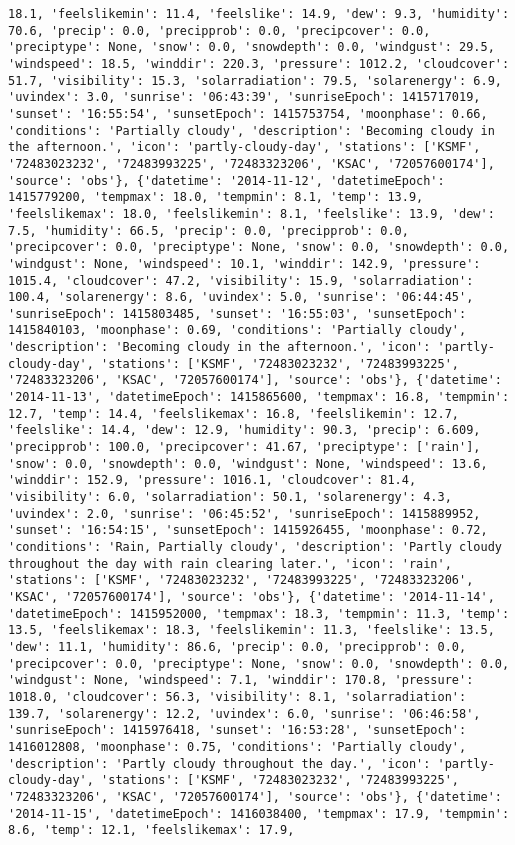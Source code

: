\documentclass[
  letterpaper,
  DIV=11,
  numbers=noendperiod]{scrartcl}
\begin{document}
\begin{verbatim}
18.1, 'feelslikemin': 11.4, 'feelslike': 14.9, 'dew': 9.3, 'humidity': 70.6, 'precip': 0.0, 'precipprob': 0.0, 'precipcover': 0.0, 'preciptype': None, 'snow': 0.0, 'snowdepth': 0.0, 'windgust': 29.5, 'windspeed': 18.5, 'winddir': 220.3, 'pressure': 1012.2, 'cloudcover': 51.7, 'visibility': 15.3, 'solarradiation': 79.5, 'solarenergy': 6.9, 'uvindex': 3.0, 'sunrise': '06:43:39', 'sunriseEpoch': 1415717019, 'sunset': '16:55:54', 'sunsetEpoch': 1415753754, 'moonphase': 0.66, 'conditions': 'Partially cloudy', 'description': 'Becoming cloudy in the afternoon.', 'icon': 'partly-cloudy-day', 'stations': ['KSMF', '72483023232', '72483993225', '72483323206', 'KSAC', '72057600174'], 'source': 'obs'}, {'datetime': '2014-11-12', 'datetimeEpoch': 1415779200, 'tempmax': 18.0, 'tempmin': 8.1, 'temp': 13.9, 'feelslikemax': 18.0, 'feelslikemin': 8.1, 'feelslike': 13.9, 'dew': 7.5, 'humidity': 66.5, 'precip': 0.0, 'precipprob': 0.0, 'precipcover': 0.0, 'preciptype': None, 'snow': 0.0, 'snowdepth': 0.0, 'windgust': None, 'windspeed': 10.1, 'winddir': 142.9, 'pressure': 1015.4, 'cloudcover': 47.2, 'visibility': 15.9, 'solarradiation': 100.4, 'solarenergy': 8.6, 'uvindex': 5.0, 'sunrise': '06:44:45', 'sunriseEpoch': 1415803485, 'sunset': '16:55:03', 'sunsetEpoch': 1415840103, 'moonphase': 0.69, 'conditions': 'Partially cloudy', 'description': 'Becoming cloudy in the afternoon.', 'icon': 'partly-cloudy-day', 'stations': ['KSMF', '72483023232', '72483993225', '72483323206', 'KSAC', '72057600174'], 'source': 'obs'}, {'datetime': '2014-11-13', 'datetimeEpoch': 1415865600, 'tempmax': 16.8, 'tempmin': 12.7, 'temp': 14.4, 'feelslikemax': 16.8, 'feelslikemin': 12.7, 'feelslike': 14.4, 'dew': 12.9, 'humidity': 90.3, 'precip': 6.609, 'precipprob': 100.0, 'precipcover': 41.67, 'preciptype': ['rain'], 'snow': 0.0, 'snowdepth': 0.0, 'windgust': None, 'windspeed': 13.6, 'winddir': 152.9, 'pressure': 1016.1, 'cloudcover': 81.4, 'visibility': 6.0, 'solarradiation': 50.1, 'solarenergy': 4.3, 'uvindex': 2.0, 'sunrise': '06:45:52', 'sunriseEpoch': 1415889952, 'sunset': '16:54:15', 'sunsetEpoch': 1415926455, 'moonphase': 0.72, 'conditions': 'Rain, Partially cloudy', 'description': 'Partly cloudy throughout the day with rain clearing later.', 'icon': 'rain', 'stations': ['KSMF', '72483023232', '72483993225', '72483323206', 'KSAC', '72057600174'], 'source': 'obs'}, {'datetime': '2014-11-14', 'datetimeEpoch': 1415952000, 'tempmax': 18.3, 'tempmin': 11.3, 'temp': 13.5, 'feelslikemax': 18.3, 'feelslikemin': 11.3, 'feelslike': 13.5, 'dew': 11.1, 'humidity': 86.6, 'precip': 0.0, 'precipprob': 0.0, 'precipcover': 0.0, 'preciptype': None, 'snow': 0.0, 'snowdepth': 0.0, 'windgust': None, 'windspeed': 7.1, 'winddir': 170.8, 'pressure': 1018.0, 'cloudcover': 56.3, 'visibility': 8.1, 'solarradiation': 139.7, 'solarenergy': 12.2, 'uvindex': 6.0, 'sunrise': '06:46:58', 'sunriseEpoch': 1415976418, 'sunset': '16:53:28', 'sunsetEpoch': 1416012808, 'moonphase': 0.75, 'conditions': 'Partially cloudy', 'description': 'Partly cloudy throughout the day.', 'icon': 'partly-cloudy-day', 'stations': ['KSMF', '72483023232', '72483993225', '72483323206', 'KSAC', '72057600174'], 'source': 'obs'}, {'datetime': '2014-11-15', 'datetimeEpoch': 1416038400, 'tempmax': 17.9, 'tempmin': 8.6, 'temp': 12.1, 'feelslikemax': 17.9, 
\end{verbatim}
\end{document}
